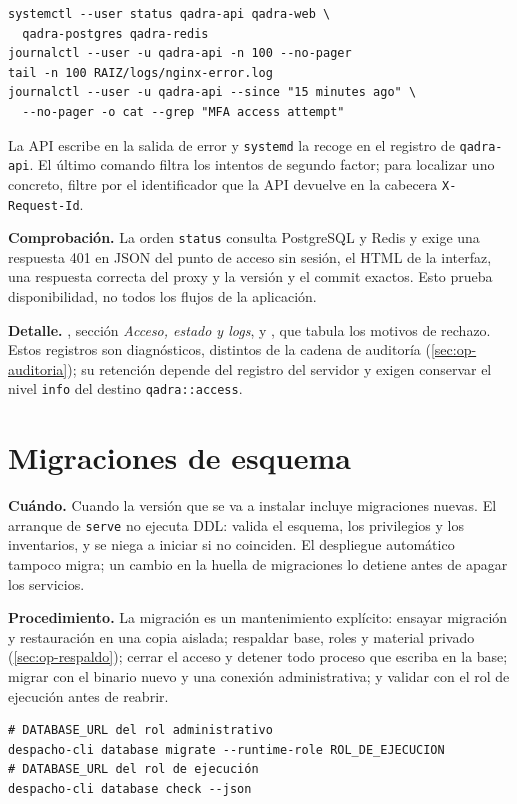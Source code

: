 \begin{verbatim}
systemctl --user status qadra-api qadra-web \
  qadra-postgres qadra-redis
journalctl --user -u qadra-api -n 100 --no-pager
tail -n 100 RAIZ/logs/nginx-error.log
journalctl --user -u qadra-api --since "15 minutes ago" \
  --no-pager -o cat --grep "MFA access attempt"
\end{verbatim}

La API escribe en la salida de error y \texttt{systemd} la recoge en el
registro de \texttt{qadra-api}. El último comando filtra los intentos de
segundo factor; para localizar uno concreto, filtre por el identificador que
la API devuelve en la cabecera \texttt{X-Request-Id}.

\textbf{Comprobación.} La orden \texttt{status} consulta PostgreSQL y
Redis y exige una respuesta 401 en JSON del punto de acceso sin sesión, el HTML
de la interfaz, una respuesta correcta del proxy y la versión y el commit exactos. Esto
prueba disponibilidad, no todos los flujos de la aplicación.

\textbf{Detalle.} , sección \emph{Acceso, estado
y logs}, y , que tabula los motivos de
rechazo. Estos registros son diagnósticos, distintos de la cadena de auditoría
(\cref{sec:op-auditoria}); su retención depende del registro del servidor y
exigen conservar el nivel \texttt{info} del destino \texttt{qadra::access}.

\section{Migraciones de esquema}\label{sec:op-migraciones}

\textbf{Cuándo.} Cuando la versión que se va a instalar incluye migraciones
nuevas. El arranque de \texttt{serve} no ejecuta DDL: valida el esquema, los
privilegios y los inventarios, y se niega a iniciar si no coinciden. El
despliegue automático tampoco migra; un cambio en la huella de migraciones lo
detiene antes de apagar los servicios.

\textbf{Procedimiento.} La migración es un mantenimiento explícito: ensayar
migración y restauración en una copia aislada; respaldar base, roles y
material privado (\cref{sec:op-respaldo}); cerrar el acceso y detener todo
proceso que escriba en la base; migrar con el binario nuevo y una conexión
administrativa; y validar con el rol de ejecución antes de reabrir.

\begin{verbatim}
# DATABASE_URL del rol administrativo
despacho-cli database migrate --runtime-role ROL_DE_EJECUCION
# DATABASE_URL del rol de ejecución
despacho-cli database check --json
\end{verbatim}


